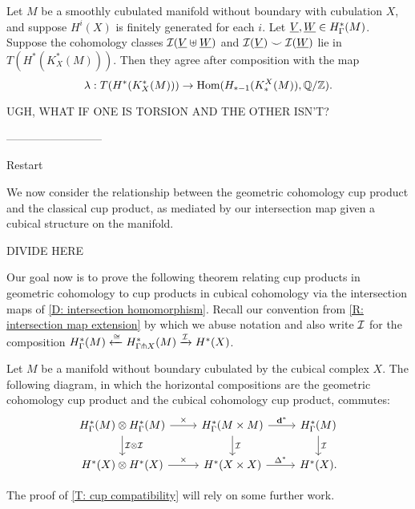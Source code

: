 \documentclass{amsart}
\begin{document}
\begin{proposition}
Let $M$ be a smoothly cubulated manifold without boundary with cubulation $X$, and suppose $H^i(X)$ is finitely generated for each $i$. Let $\underline{V},\underline{W}\in H^*_\Gamma(M)$. Suppose the cohomology classes $\mathcal{I}(\underline{V}\uplus\underline{W})$ and $\mathcal{I}(\underline{V}) \smile \mathcal{I}(\underline{W})$ lie in $T(H^*(K_X^*(M)))$. Then they agree after composition with the map $$\lambda:T(H^*(K_X^*(M)))\to \textup{Hom}(H_{*-1}(K_*^X(M)),\mathbb{Q}/\mathbb{Z}).$$
\end{proposition}

UGH, WHAT IF ONE IS TORSION AND THE OTHER ISN'T?

--------------------------
\pagebreak

Restart


We now consider the relationship between the geometric cohomology cup product and the classical cup product, as mediated by our intersection map given a cubical structure on the manifold.


DIVIDE HERE


Our goal now is to prove the following theorem relating cup products in geometric cohomology to cup products in cubical cohomology via the intersection maps of \cref{D: intersection homomorphism}.
Recall our convention from \cref{R: intersection map extension} by which we abuse notation and also write $\mathcal{I}$ for the composition $H^*_\Gamma(M) \xleftarrow{\cong} H^*_{\Gamma \pitchfork X}(M) \xrightarrow{\mathcal{I}} H^*(X)$.

\begin{theorem}\label{T: cup compatibility}
Let $M$ be a manifold without boundary cubulated by the cubical complex $X$.
The following diagram, in which the horizontal compositions are the geometric cohomology cup product and the cubical cohomology cup product, commutes:
	\[
	\begin{tikzcd}
	H^*_\Gamma(M) \otimes H^*_\Gamma(M) \arrow[r,"\times"]\arrow[d,"\mc I \otimes \mc I"]& H^*_\Gamma(M \times M) \arrow[d,"\mc I"]\arrow[r,"\diag^*"] & H^*_\Gamma(M) \arrow[d,"\mc I"]\\
	H^*(X) \otimes H^*(X) \arrow[r,"\times"]& H^*(X \times X) \arrow[r,"\Delta^*"] & H^*(X).
	\end{tikzcd}
	\]
\end{theorem}

The proof of \cref{T: cup compatibility} will rely on some further work.
\end{document}
